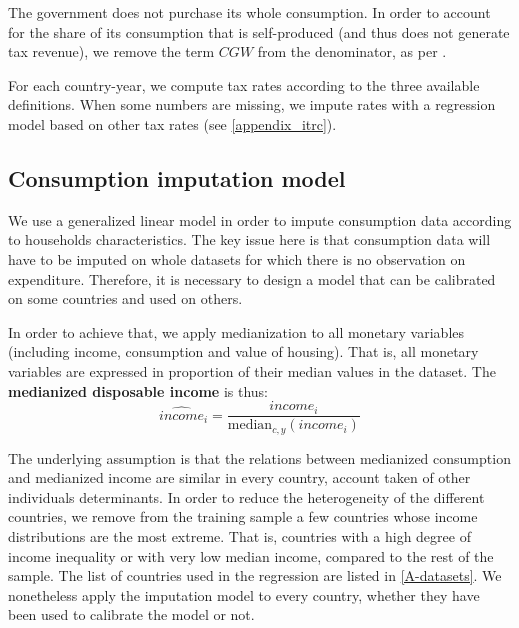 The government does not purchase its whole consumption. In order to account for the share of its consumption that is self-produced (and thus does not generate tax revenue), we remove the term $CGW$ from the denominator, as per \cite{mendoza1994effective}.

For each country-year, we compute tax rates according to the three available definitions. When some numbers are missing, we impute rates with a regression model based on other tax rates (see \cref{appendix_itrc}).


\subsection{Consumption imputation model}
\label{app:imputation_model}

We use a generalized linear model in order to impute consumption data according to households characteristics. The key issue here is that consumption data will have to be imputed on whole datasets for which there is no observation on expenditure. Therefore, it is necessary to design a model that can be calibrated on some countries and used on others.

In order to achieve that, we apply medianization to all monetary variables (including income, consumption and value of housing). That is, all monetary variables are expressed in proportion of their median values in the dataset. The \textbf{medianized disposable income} is thus:
\[ \widehat{income}_i = \frac{income_i}{\text{median}_{c,y}(income_i)} \]

The underlying assumption is that the relations between medianized consumption and medianized income are similar in every country, account taken of other individuals determinants. In order to reduce the heterogeneity of the different countries, we remove from the training sample a few countries whose income distributions are the most extreme. That is, countries with a high degree of income inequality or with very low median income, compared to the rest of the sample. The list of countries used in the regression are listed in \cref{A-datasets}. We nonetheless apply the imputation model to every country, whether they have been used to calibrate the model or not.

